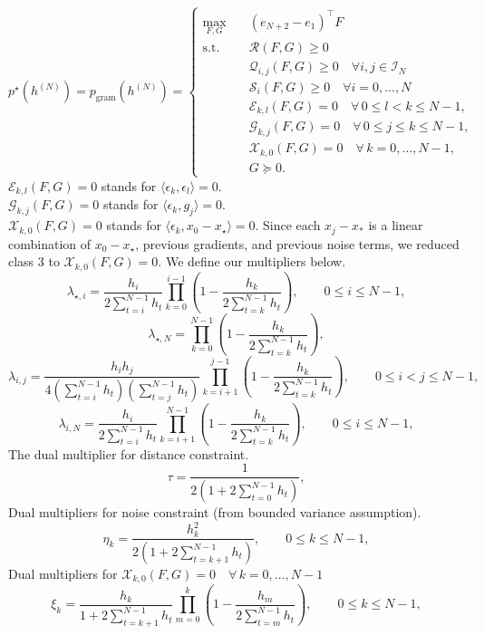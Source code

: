 \begin{equation}
p^\star(h^{(N)}) = p_{\text{gram}}(h^{(N)}) = 
\left\{
\begin{aligned}
    \max_{F,G} \quad & (e_{N+2} - e_1)^{\top} F \\
    \text{s.t.} \quad & \mathcal{R}(F, G) \ge 0 \\
    & \mathcal{Q}_{i,j}(F, G) \ge 0 \quad \forall i, j \in \mathcal{I}_N \\
    & \mathcal{S}_i(F, G) \ge 0 \quad \forall i = 0, \dots, N \\
    & \mathcal{E}_{k,l}(F,G)=0  \quad \forall\, 0\le l<k\le N-1, \\
    & \mathcal{G}_{k,j}(F,G)=0  \quad \forall\, 0\le j\le k\le N-1, \\
    & \mathcal{X}_{k,0}(F,G)=0 \quad \forall\, k=0,\dots,N-1, \\
    & G \succeq 0.
\end{aligned}
\right.
\end{equation}
$\mathcal{E}_{k,l}(F,G)=0$ stands for $\langle\epsilon_k, \epsilon_l \rangle = 0$.\\
$\mathcal{G}_{k,j}(F,G)=0$ stands for $\langle\epsilon_k, g_j \rangle = 0$.\\
$\mathcal{X}_{k,0}(F,G)=0$ stands for $\langle\epsilon_k, x_0-x_\star \rangle = 0$.
Since each \(x_j-x_*\) is a linear combination of \(x_0-x_\star\), previous gradients, and previous noise terms, we reduced class 3 to $\mathcal{X}_{k,0}(F,G)=0.$
We define our multipliers below.\\
\[ \lambda_{\star,i} = \frac{h_i} {2\sum_{t=i}^{N-1}h_t} \prod_{k=0}^{i-1} \left(1-\frac{h_k}{2\sum_{t=k}^{N-1}h_t}\right),\qquad0\leq i\leq N-1,\]
\[ \lambda_{\star,N}= \prod_{k=0}^{N-1} \left( 1-\frac{h_k}{2\sum_{t=k}^{N-1}h_t} \right), \]
\[\lambda_{i,j}=\frac{h_i h_j}{4\left(\sum_{t=i}^{N-1}h_t\right) \left(\sum_{t=j}^{N-1}h_t\right)} \prod_{k=i+1}^{j-1} \left( 1-\frac{h_k}{2\sum_{t=k}^{N-1}h_t} \right), \qquad 0\leq i<j\leq N-1, \]
\[\lambda_{i,N}=\frac{h_i}{2\sum_{t=i}^{N-1}h_t}\prod_{k=i+1}^{N-1}
\left(1-\frac{h_k}{2\sum_{t=k}^{N-1}h_t}\right),\qquad 0\leq i\leq N-1,\]
The dual multiplier for distance constraint.
\[ \tau = \frac{1} {2\left(1+2\sum_{t=0}^{N-1}h_t\right)}, \]
Dual multipliers for noise constraint (from bounded variance assumption).
\[\eta_k=\frac{h_k^2} {2\left(1+2\sum_{t=k+1}^{N-1}h_t\right)}, \qquad 0\leq k\leq N-1, \]
Dual multipliers for $\mathcal{X}_{k,0}(F,G)=0 \quad \forall\, k=0,\dots,N-1 $
\[\xi_k= \frac{h_k} {1+2\sum_{t=k+1}^{N-1}h_t} \prod_{m=0}^{k} \left( 1-\frac{h_m}{2\sum_{t=m}^{N-1}h_t} \right), \qquad 0\leq k\leq N-1, \]
